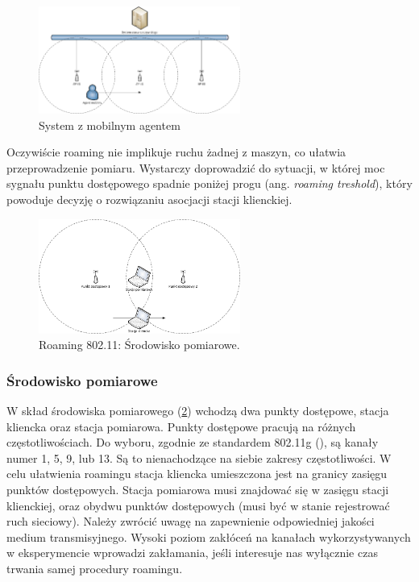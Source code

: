 \begin{figure}[htb]
\begin{center}
\includegraphics[width=250px]{img/System_czasu_rzeczywistego}
\caption{System z mobilnym agentem}
\label{MobileAgentSystem}
\end{center}
\end{figure}

Oczywiście roaming nie implikuje ruchu żadnej z maszyn, co ułatwia przeprowadzenie pomiaru. Wystarczy doprowadzić do sytuacji, w której moc sygnału punktu dostępowego spadnie poniżej progu (ang. \emph{roaming treshold}), który powoduje decyzję o rozwiązaniu asocjacji stacji klienckiej. 

\begin{figure}[htb]
\begin{center}
\includegraphics[width=250px]{img/Roaming}
\caption{Roaming 802.11: Środowisko pomiarowe.}
\label{RoamingEnviroment}
\end{center}
\end{figure}

\subsubsection{Środowisko pomiarowe}

W skład środowiska pomiarowego (\ref{RoamingEnviroment}) wchodzą dwa punkty dostępowe, stacja kliencka oraz stacja pomiarowa. Punkty dostępowe pracują na różnych częstotliwościach. Do wyboru, zgodnie ze standardem 802.11g (\cite{std:IEEE80211}), są kanały numer 1, 5, 9, lub 13. Są to nienachodzące na siebie zakresy częstotliwości. W celu ułatwienia roamingu stacja kliencka umieszczona jest na granicy zasięgu punktów dostępowych. Stacja pomiarowa musi znajdować się w zasięgu stacji klienckiej, oraz obydwu punktów dostępowych (musi być w stanie rejestrować ruch sieciowy). 
Należy zwrócić uwagę na zapewnienie odpowiedniej jakości medium transmisyjnego. Wysoki poziom zakłóceń na kanałach wykorzystywanych w eksperymencie wprowadzi zakłamania, jeśli interesuje nas wyłącznie czas trwania samej procedury roamingu. 


